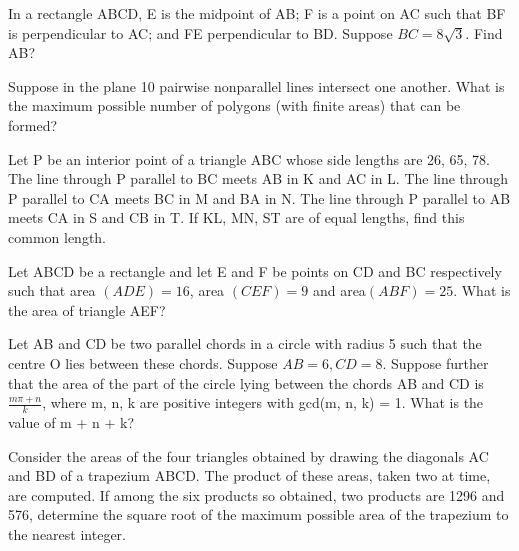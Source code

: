 \item In a rectangle ABCD, E is the midpoint of AB; F is a point on AC such that BF is perpendicular to AC; and FE perpendicular to BD. Suppose $BC = 8\sqrt{3}$. Find AB?

\item Suppose in the plane 10 pairwise nonparallel lines intersect one another. What is the maximum possible number of polygons (with ﬁnite areas) that can be formed?

\item  Let P be an interior point of a triangle ABC whose side lengths are 26, 65, 78. The line through P parallel to BC meets AB in K and AC in L. The line through P parallel to CA meets BC in M and BA in N. The line through P parallel to AB meets CA in S and CB in T. If KL, MN, ST are of equal lengths, find this common length.

\item  Let ABCD be a rectangle and let E and F be points on CD and BC respectively such that area $(ADE) = 16$,  area 
$(CEF) = 9$ and area$(ABF) = 25$. What is the area of triangle AEF? 

\item  Let AB and CD be two parallel chords in a circle with radius 5 such that the centre O lies between these chords. Suppose $AB = 6 , CD = 8$. Suppose further that the area of the part of the circle lying between the chords AB and CD is 
$\frac{m\pi + n}{k}$, where m, n, k are positive integers with gcd(m, n, k) = 1. What is the value of m + n + k? 

\item Consider the areas of the four triangles obtained by drawing the diagonals AC and BD of a trapezium ABCD. The product of these areas, taken two at time, are computed. If among the six products so obtained, two products are 1296 and 576, determine the square root of the maximum possible area of the trapezium to the nearest integer.



